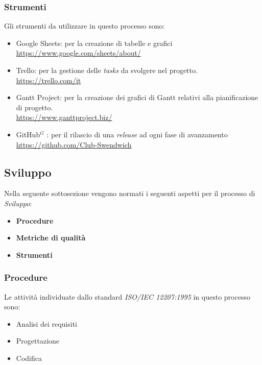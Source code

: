 \subsubsection{Strumenti}
Gli strumenti da utilizzare in questo processo sono:

\begin{itemize}
    \item Google Sheets: per la creazione di tabelle e grafici \\
    \href{https://www.google.com/sheets/about/}{https://www.google.com/sheets/about/}
    \item Trello: per la gestione delle \textit{tasks} da svolgere nel progetto.\\
    \href{https://trello.com/it}{https://trello.com/it}
    \item Gantt Project: per la creazione dei grafici di Gantt relativi alla pianificazione di progetto.\\
    \href{https://www.ganttproject.biz/}{https://www.ganttproject.biz/}
    \item GitHub$^G$ : per il rilascio di una \textit{release} ad ogni fase di avanzamento\\
    \href{https://github.com/Club-Swendwich}{https://github.com/Club-Swendwich}
\end{itemize}

\newpage
\subsection{Sviluppo}
Nella seguente sottosezione vengono normati i seguenti aspetti per il
processo di \textit{Sviluppo}:
\begin{itemize}
    \item \textbf{Procedure}
    \item \textbf{Metriche di qualità}
    \item \textbf{Strumenti}
\end{itemize}

\subsubsection{Procedure}

Le attività individuate dallo standard \textit{ISO/IEC 12207:1995} in questo processo sono:
\begin{itemize}
    \item Analisi dei requisiti
    \item Progettazione
    \item Codifica
\end{itemize}

